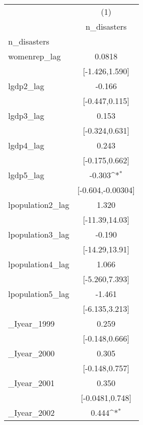 {
\def\sym#1{\ifmmode^{#1}\else\(^{#1}\)\fi}
\begin{tabular}{l*{1}{c}}
\hline\hline
            &\multicolumn{1}{c}{(1)}        \\
            &\multicolumn{1}{c}{n\_disasters}\\
\hline
n\_disasters &                               \\
womenrep\_lag&                0.0818         \\
            &        [-1.426,1.590]         \\
[1em]
lgdp2\_lag   &                -0.166         \\
            &        [-0.447,0.115]         \\
[1em]
lgdp3\_lag   &                 0.153         \\
            &        [-0.324,0.631]         \\
[1em]
lgdp4\_lag   &                 0.243         \\
            &        [-0.175,0.662]         \\
[1em]
lgdp5\_lag   &                -0.303\sym{*}  \\
            &     [-0.604,-0.00304]         \\
[1em]
lpopulation2\_lag&                 1.320         \\
            &        [-11.39,14.03]         \\
[1em]
lpopulation3\_lag&                -0.190         \\
            &        [-14.29,13.91]         \\
[1em]
lpopulation4\_lag&                 1.066         \\
            &        [-5.260,7.393]         \\
[1em]
lpopulation5\_lag&                -1.461         \\
            &        [-6.135,3.213]         \\
[1em]
\_Iyear\_1999 &                 0.259         \\
            &        [-0.148,0.666]         \\
[1em]
\_Iyear\_2000 &                 0.305         \\
            &        [-0.148,0.757]         \\
[1em]
\_Iyear\_2001 &                 0.350         \\
            &       [-0.0481,0.748]         \\
[1em]
\_Iyear\_2002 &                 0.444\sym{*}  \\

\end{tabular}}
